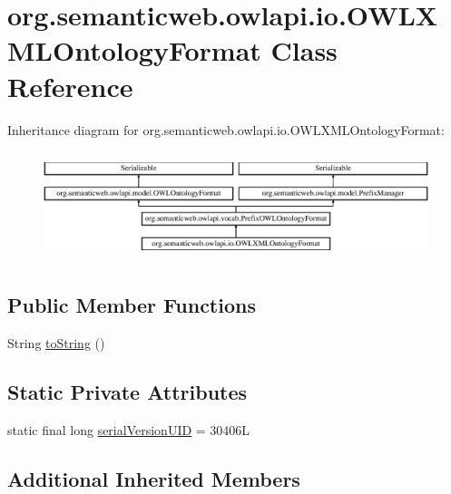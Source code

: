 \hypertarget{classorg_1_1semanticweb_1_1owlapi_1_1io_1_1_o_w_l_x_m_l_ontology_format}{\section{org.\-semanticweb.\-owlapi.\-io.\-O\-W\-L\-X\-M\-L\-Ontology\-Format Class Reference}
\label{classorg_1_1semanticweb_1_1owlapi_1_1io_1_1_o_w_l_x_m_l_ontology_format}
}
Inheritance diagram for org.\-semanticweb.\-owlapi.\-io.\-O\-W\-L\-X\-M\-L\-Ontology\-Format\-:\begin{figure}[H]
\begin{center}
\leavevmode
\includegraphics[height=3.209169cm]{classorg_1_1semanticweb_1_1owlapi_1_1io_1_1_o_w_l_x_m_l_ontology_format}
\end{center}
\end{figure}
\subsection*{Public Member Functions}
\begin{DoxyCompactItemize}
\item 
String \hyperlink{classorg_1_1semanticweb_1_1owlapi_1_1io_1_1_o_w_l_x_m_l_ontology_format_aac9d2137dad886c3d178268cf1929cf2}{to\-String} ()
\end{DoxyCompactItemize}
\subsection*{Static Private Attributes}
\begin{DoxyCompactItemize}
\item 
static final long \hyperlink{classorg_1_1semanticweb_1_1owlapi_1_1io_1_1_o_w_l_x_m_l_ontology_format_a14f20dec6f4ecac13a763988e7c95771}{serial\-Version\-U\-I\-D} = 30406\-L
\end{DoxyCompactItemize}
\subsection*{Additional Inherited Members}


